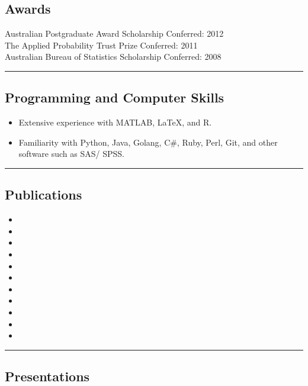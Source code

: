 \documentclass[a4paper,12pt]{report}
\begin{document}
\subsection*{Awards}
Australian Postgraduate Award Scholarship \hfill Conferred: 2012 \\ 
The Applied Probability Trust Prize \hfill Conferred: 2011 \\
Australian Bureau of Statistics Scholarship \hfill Conferred: 2008 \\

\hrule

\subsection*{Programming and Computer Skills}          
\begin{itemize}
	\item Extensive experience with MATLAB, \LaTeX, and R.
	\item Familiarity with Python, Java, Golang, C\#, Ruby, Perl, Git, and other software such as SAS/ SPSS. 
\end{itemize}


\hrule

\subsection*{Publications}          

\begin{itemize}
	\item {}
	\item {}
	\item {}
	\item {}
	\item {}
	\item {}
	\item {}
	\item {}
	\item {}
	\item {}
	\item {}
\end{itemize}


\hrule


\subsection*{Presentations}          
\end{document}
